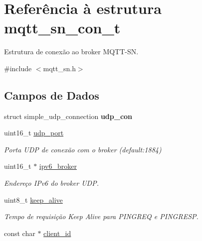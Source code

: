 \hypertarget{structmqtt__sn__con__t}{\section{Referência à estrutura mqtt\+\_\+sn\+\_\+con\+\_\+t}
\label{structmqtt__sn__con__t}
}


Estrutura de conexão ao broker M\+Q\+T\+T-\/\+S\+N.  




{\ttfamily \#include $<$mqtt\+\_\+sn.\+h$>$}

\subsection*{Campos de Dados}
\begin{DoxyCompactItemize}
\item 
\hypertarget{structmqtt__sn__con__t_a60158486bd2056b682241cd713f462ac}{struct simple\+\_\+udp\+\_\+connection {\bfseries udp\+\_\+con}}\label{structmqtt__sn__con__t_a60158486bd2056b682241cd713f462ac}

\item 
\hypertarget{structmqtt__sn__con__t_ae3c6408a5f3fb41bcddcf7e8266f41a6}{uint16\+\_\+t \hyperlink{structmqtt__sn__con__t_ae3c6408a5f3fb41bcddcf7e8266f41a6}{udp\+\_\+port}}\label{structmqtt__sn__con__t_ae3c6408a5f3fb41bcddcf7e8266f41a6}

\begin{DoxyCompactList}\small\item\em Porta U\+D\+P de conexão com o broker (default\+:1884) \end{DoxyCompactList}\item 
\hypertarget{structmqtt__sn__con__t_a058796ada31936dced646e5da3eb329a}{uint16\+\_\+t $\ast$ \hyperlink{structmqtt__sn__con__t_a058796ada31936dced646e5da3eb329a}{ipv6\+\_\+broker}}\label{structmqtt__sn__con__t_a058796ada31936dced646e5da3eb329a}

\begin{DoxyCompactList}\small\item\em Endereço I\+Pv6 do broker U\+D\+P. \end{DoxyCompactList}\item 
\hypertarget{structmqtt__sn__con__t_a276b967ec5d6e3305ee4695488e4472b}{uint8\+\_\+t \hyperlink{structmqtt__sn__con__t_a276b967ec5d6e3305ee4695488e4472b}{keep\+\_\+alive}}\label{structmqtt__sn__con__t_a276b967ec5d6e3305ee4695488e4472b}

\begin{DoxyCompactList}\small\item\em Tempo de requisição Keep Alive para P\+I\+N\+G\+R\+E\+Q e P\+I\+N\+G\+R\+E\+S\+P. \end{DoxyCompactList}\item 
\hypertarget{structmqtt__sn__con__t_a3880622ca383fee22fbbac18442bae32}{const char $\ast$ \hyperlink{structmqtt__sn__con__t_a3880622ca383fee22fbbac18442bae32}{client\+\_\+id}}\label{structmqtt__sn__con__t_a3880622ca383fee22fbbac18442bae32}


\end{DoxyCompactItemize}
